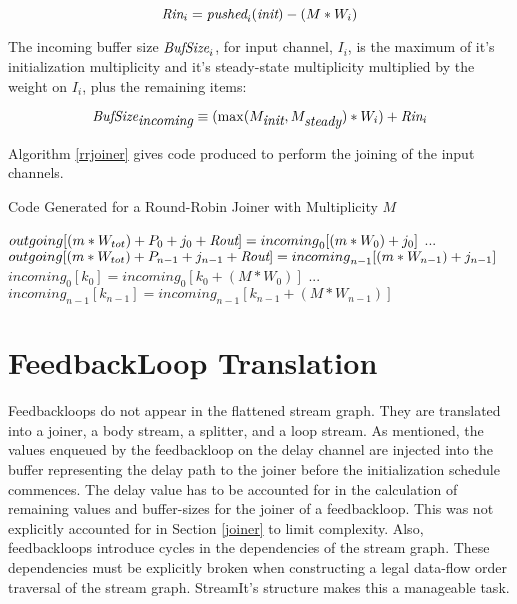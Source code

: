 \documentclass[10pt, letterpaper, onecolumn]{article}
\begin{document}
\begin{displaymath}
\mbox{\it Rin}_i = \mbox{\it pushed}_i(\mbox{\it init}) - (M * W_{i})
\end{displaymath}

The incoming buffer size $\mbox{\it BufSize}_i$, for input channel, $I_i$,
is the maximum of it's initialization multiplicity and it's
steady-state multiplicity multiplied by the weight on $I_i$, plus the
remaining items:

\begin{displaymath}
\mbox{\it BufSize}_{\mbox{\it incoming}} \equiv (\max(M_{\mbox{\it init}}, M_{\mbox{\it steady}}) * W_{i}) + \mbox{\it Rin}_i
\end{displaymath}


Algorithm \ref{rrjoiner} gives code produced to perform the joining of the input
channels.

\begin{algorithm}
\label{rrjoiner}
\caption{Code Generated for a Round-Robin Joiner with Multiplicity $M$}
\begin{algorithmic}
\STATE $outgoing[(m * W_{tot}) + P_0 + j_0 + \mbox{\it Rout}] =
       {incoming}_0[(m * W_0) + j_0]$
\ENDFOR
\STATE ...
\STATE $outgoing[(m * W_{tot}) + P_{n-1} + j_{n-1} + \mbox{\it Rout}] =
       {incoming}_{n-1}[(m * W_{n-1}) + j_{n-1}]$
\ENDFOR
\ENDFOR
{}
\STATE ${incoming}_0[k_0] = {incoming}_0[k_0 + (M * W_0)]$
\ENDFOR
\STATE ...
\STATE ${incoming}_{n-1}[k_{n-1}] = {incoming}_{n-1}[k_{n-1} + (M * W_{n-1})]$
\ENDFOR
\end{algorithmic}
\end{algorithm}

\section{FeedbackLoop Translation}
Feedbackloops do not appear in the flattened stream graph.  They are
translated into a joiner, a body stream, a splitter, and a loop
stream.  As mentioned, the values enqueued by the feedbackloop on the
delay channel are injected into the buffer representing the delay path
to the joiner before the initialization schedule commences.  The delay
value has to be accounted for in the calculation of remaining values
and buffer-sizes for the joiner of a feedbackloop.  This was not
explicitly accounted for in Section \ref{joiner} to limit
complexity. Also, feedbackloops introduce cycles in the dependencies
of the stream graph.  These dependencies must be explicitly broken
when constructing a legal data-flow order traversal of the stream
graph.  StreamIt's structure makes this a manageable task.
\end{document}
